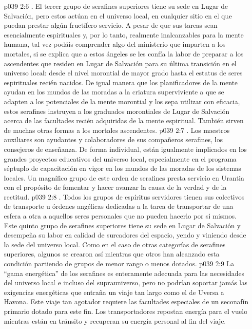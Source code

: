 \vs p039 2:6 . El tercer grupo de serafines superiores tiene su sede en Lugar de Salvación, pero estos actúan en el universo local, en cualquier sitio en el que puedan prestar algún fructífero servicio. A pesar de que sus tareas sean esencialmente espirituales y, por lo tanto, realmente inalcanzables para la mente humana, tal vez podáis comprender algo del ministerio que imparten a los mortales, si se explica que a estos ángeles se les confía la labor de preparar a los ascendentes que residen en Lugar de Salvación para su última transición en el universo local: desde el nivel morontial de mayor grado hasta el estatus de seres espirituales recién nacidos. De igual manera que los planificadores de la mente ayudan en los mundos de las moradas a la criatura superviviente a que se adapten a los potenciales de la mente morontial y los sepa utilizar con eficacia, estos serafines instruyen a los graduados morontiales de Lugar de Salvación acerca de las facultades recién adquiridas de la mente espiritual. También sirven de muchas otras formas a los mortales ascendentes.
\vs p039 2:7 . Los maestros auxiliares son ayudantes y colaboradores de sus compañeros serafines, los consejeros de enseñanza. De forma individual, están igualmente implicados en los grandes proyectos educativos del universo local, especialmente en el programa séptuplo de capacitación en vigor en los mundos de las moradas de los sistemas locales. Un magnífico grupo de este orden de serafines presta servicio en Urantia con el propósito de fomentar y hacer avanzar la causa de la verdad y de la rectitud.
\vs p039 2:8 . Todos los grupos de espíritus servidores tienen sus colectivos de transporte u órdenes angélicas dedicadas a la tarea de transportar de una esfera a otra a aquellos seres personales que no pueden hacerlo por sí mismos. Este quinto grupo de serafines superiores tiene su sede en Lugar de Salvación y desempeña su labor en calidad de surcadores del espacio, yendo y viniendo desde la sede del universo local. Como en el caso de otras categorías de serafines superiores, algunos se crearon así mientras que otros han alcanzado esta condición partiendo de grupos de menor rango o menos dotados.
\vs p039 2:9 \pc La “gama energética” de los serafines es enteramente adecuada para las necesidades del universo local e incluso del suprauniverso, pero no podrían soportar jamás las exigencias energéticas que entraña un viaje tan largo como el de Uversa a Havona. Este viaje tan agotador requiere las facultades especiales de un seconafín primario dotado para este fin. Los transportadores repostan energía para el vuelo mientras están en tránsito y recuperan su energía personal al fin del viaje.

